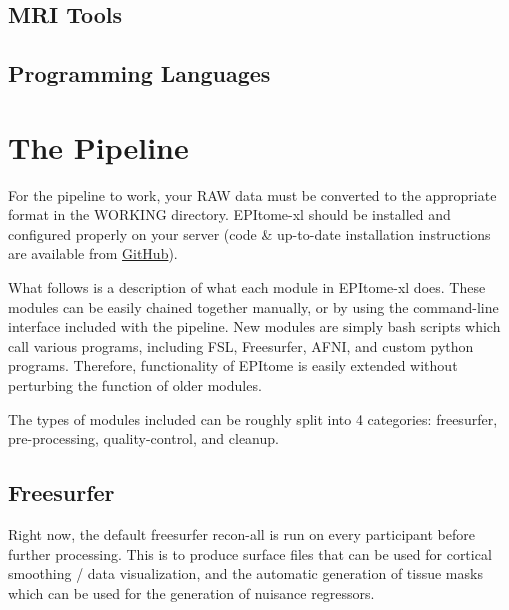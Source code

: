 \documentclass[final,titlepage,letterpaper,oneside,12pt]{article}
\begin{document}
\subsection{MRI Tools}
\subsection{Programming Languages}

\section{The Pipeline}

For the pipeline to work, your RAW data must be converted to the appropriate format in the WORKING directory. EPItome-xl should be installed and configured properly on your server (code \& up-to-date installation instructions are available from \href{https://github.com/josephdviviano/EPItome-xl}{GitHub}).

What follows is a description of what each module in EPItome-xl does. These modules can be easily chained together manually, or by using the command-line interface included with the pipeline. New modules are simply bash scripts which call various programs, including FSL, Freesurfer, AFNI, and custom python programs. Therefore, functionality of EPItome is easily extended without perturbing the function of older modules.

The types of modules included can be roughly split into 4 categories: freesurfer, pre-processing, quality-control, and cleanup.

\subsection{Freesurfer}

Right now, the default freesurfer recon-all is run on every participant before further processing. This is to produce surface files that can be used for cortical smoothing / data visualization, and the automatic generation of tissue masks which can be used for the generation of nuisance regressors. 

\end{document}
